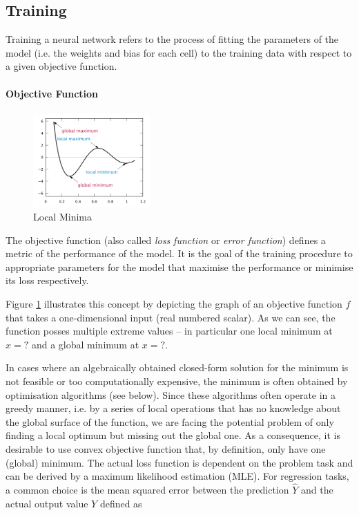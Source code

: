 \subsection{Training}
Training a neural network refers to the process of fitting the parameters of the model (i.e. the weights and bias for each cell) to the training data with respect to a given objective function. 

\paragraph{Objective Function}
\begin{figure}
	\centering
	\includegraphics[width=0.4\textwidth]{figures/chapter-2/local-minima.png}
	\caption{Local Minima}\label{fig:local-minima}   
\end{figure}

The objective function (also called \emph{loss function} or \emph{error function}) defines a metric of the performance of the model. It is the goal of the training procedure to appropriate parameters for the model that maximise the performance or minimise its loss respectively. 

Figure \ref{fig:local-minima} illustrates this concept by depicting the graph of an objective function $f$ that takes a one-dimensional input (real numbered scalar). As we can see, the function posses multiple extreme values -- in particular one local minimum at $x = ?$%
and a global minimum at $x = ?$. %


In cases where an algebraically obtained closed-form solution for the minimum is not feasible or too computationally expensive, the minimum is often obtained by optimisation algorithms (see below). Since these algorithms often operate in a greedy manner, i.e. by a series of local operations that has no knowledge about the global surface of the function, we are facing the potential problem of only finding a local optimum but missing out the global one. As a consequence, it is desirable to use convex objective function that, by definition, only have one (global) minimum. 
The actual loss function is dependent on the problem task and can be derived by a maximum likelihood estimation (MLE). For regression tasks, a common choice is the mean squared error between the prediction $\hat{Y}$ and the actual output value $Y$ defined as 


